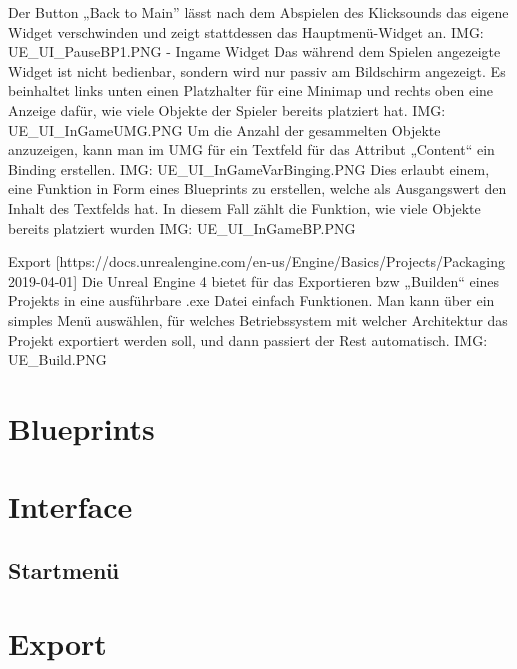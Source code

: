 Der Button „Back to Main” lässt nach dem Abspielen des Klicksounds das eigene Widget verschwinden und zeigt stattdessen das Hauptmenü-Widget an.
{IMG: UE_UI_PauseBP1.PNG}
-	Ingame Widget
Das während dem Spielen angezeigte Widget ist nicht bedienbar, sondern wird nur passiv am Bildschirm angezeigt. Es beinhaltet links unten einen Platzhalter für eine Minimap und rechts oben eine Anzeige dafür, wie viele Objekte der Spieler bereits platziert hat.
{IMG: UE_UI_InGameUMG.PNG}
Um die Anzahl der gesammelten Objekte anzuzeigen, kann man im UMG für ein Textfeld für das Attribut „Content“ ein Binding erstellen.
{IMG: UE_UI_InGameVarBinging.PNG}
Dies erlaubt einem, eine Funktion in Form eines Blueprints zu erstellen, welche als Ausgangswert den Inhalt des Textfelds hat.
In diesem Fall zählt die Funktion, wie viele Objekte bereits platziert wurden
{IMG: UE_UI_InGameBP.PNG}


Export [https://docs.unrealengine.com/en-us/Engine/Basics/Projects/Packaging 2019-04-01]
Die Unreal Engine 4 bietet für das Exportieren bzw „Builden“ eines Projekts in eine ausführbare .exe Datei einfach Funktionen. Man kann über ein simples Menü auswählen, für welches Betriebssystem mit welcher Architektur das Projekt exportiert werden soll, und dann passiert der Rest automatisch.
{IMG: UE_Build.PNG}



\section{Blueprints}
\section{Interface}
\subsection{Startmenü}
\section{Export}